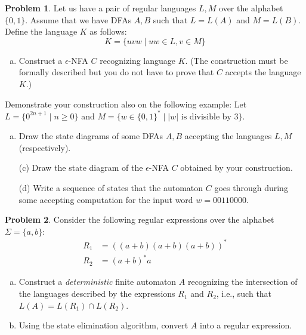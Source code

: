 \documentclass[a4paper,12pt]{article}
\theoremstyle{definition}
\newtheorem{problem}{Problem}
\begin{document}
\begin{problem}
    Let us have a pair of regular languages $L,M$ over the alphabet $\{0,1\}$. Assume that we have DFAs $A,B$ such that $L=L(A)$ and $M=L(B)$. Define the language $K$ as follows:
	$$K=\{uvw\mid uw\in L, v\in M\}$$

    \begin{enumerate}[(a)]	
		\item Construct a $\epsilon$-NFA $C$ recognizing language $K$. 
		(The construction must be formally described but you do not have to prove that $C$ accepts the language $K$.)
	\end{enumerate}
	Demonstrate your construction also on the following example: Let $L=\{0^{2n+1}\mid n\geq 0\}$ and $M=\{w\in\{0,1\}^*\mid |w|\text{ is divisible by 3}\}$.
	
	\smallskip
	\begin{enumerate}[(b)]
		\item Draw the state diagrams of some DFAs $A,B$ accepting the languages $L,M$ (respectively). 
		\item[(c)] Draw the state diagram of the $\epsilon$-NFA $C$ obtained by your construction.
		\item[(d)] Write a sequence of states that the automaton $C$ goes through during some accepting computation for the input word $w=00110000$.
	\end{enumerate}    
  
\end{problem}


\bigskip


\begin{problem}
    Consider the following regular expressions over the alphabet $\Sigma=\{a,b\}$:
    \begin{align*}
        R_1&=((a + b)(a + b)(a + b))^*\\
        R_2&=(a+b)^*a
    \end{align*}
    \begin{enumerate}[(a)]
        \item Construct a \emph{deterministic} finite automaton $A$ recognizing the intersection of the languages described by the expressions $R_1$ and $R_2$, i.e., such that $L(A)= L(R_1) \cap L(R_2)$.
        \item Using the state elimination algorithm, convert $A$ into a regular expression.
    \end{enumerate}
\end{problem}


\bigskip
\end{document}
